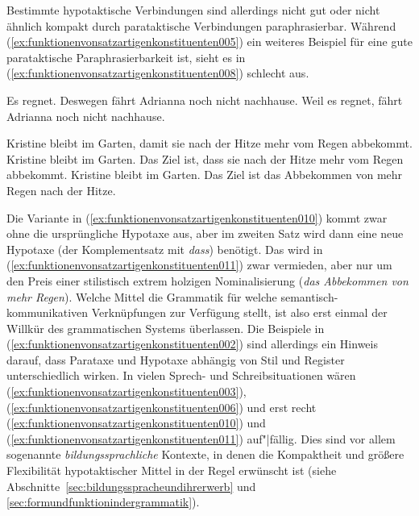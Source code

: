 Bestimmte hypotaktische Verbindungen sind allerdings nicht gut oder nicht ähnlich kompakt durch parataktische Verbindungen paraphrasierbar.
Während (\ref{ex:funktionenvonsatzartigenkonstituenten005}) ein weiteres Beispiel für eine gute parataktische Paraphrasierbarkeit ist, sieht es in (\ref{ex:funktionenvonsatzartigenkonstituenten008}) schlecht aus.

\begin{exe}
  \ex\label{ex:funktionenvonsatzartigenkonstituenten005}
  \begin{xlist}
    \ex\label{ex:funktionenvonsatzartigenkonstituenten006} Es regnet. Deswegen fährt Adrianna noch nicht nachhause.
    \ex\label{ex:funktionenvonsatzartigenkonstituenten007} Weil es regnet, fährt Adrianna noch nicht nachhause.
  \end{xlist}
  \ex\label{ex:funktionenvonsatzartigenkonstituenten008}
  \begin{xlist}
    \ex\label{ex:funktionenvonsatzartigenkonstituenten009} Kristine bleibt im Garten, damit sie nach der Hitze mehr vom Regen abbekommt.
    \ex\label{ex:funktionenvonsatzartigenkonstituenten010} Kristine bleibt im Garten. Das Ziel ist, dass sie nach der Hitze mehr vom Regen abbekommt.
    \ex\label{ex:funktionenvonsatzartigenkonstituenten011} Kristine bleibt im Garten. Das Ziel ist das Abbekommen von mehr Regen nach der Hitze.
  \end{xlist}
\end{exe}

Die Variante in (\ref{ex:funktionenvonsatzartigenkonstituenten010}) kommt zwar ohne die ursprüngliche Hypotaxe aus, aber im zweiten Satz wird dann eine neue Hypotaxe (der Komplementsatz mit \textit{dass}) benötigt.
Das wird in (\ref{ex:funktionenvonsatzartigenkonstituenten011}) zwar vermieden, aber nur um den Preis einer stilistisch extrem holzigen Nominalisierung (\textit{das Abbekommen von mehr Regen}).
Welche Mittel die Grammatik für welche semantisch-kommunikativen Verknüpfungen zur Verfügung stellt, ist also erst einmal der Willkür des grammatischen Systems überlassen.
Die Beispiele in (\ref{ex:funktionenvonsatzartigenkonstituenten002}) sind allerdings ein Hinweis darauf, dass Parataxe und Hypotaxe abhängig von Stil und Register unterschiedlich wirken.
In vielen Sprech- und Schreibsituationen wären (\ref{ex:funktionenvonsatzartigenkonstituenten003}), (\ref{ex:funktionenvonsatzartigenkonstituenten006}) und erst recht (\ref{ex:funktionenvonsatzartigenkonstituenten010}) und (\ref{ex:funktionenvonsatzartigenkonstituenten011}) auf"|fällig.
Dies sind vor allem sogenannte \textit{bildungssprachliche} Kontexte, in denen die Kompaktheit und größere Flexibilität hypotaktischer Mittel in der Regel erwünscht ist (siehe Abschnitte~\ref{sec:bildungsspracheundihrerwerb} und \ref{sec:formundfunktionindergrammatik}).

